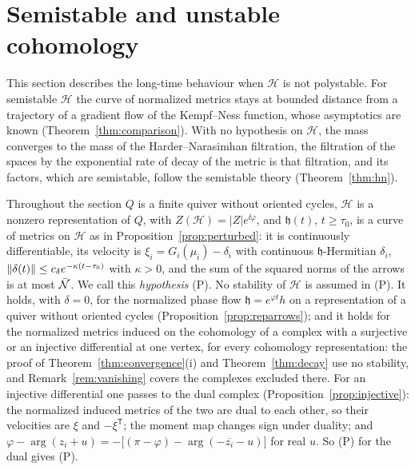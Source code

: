 \section{Semistable and unstable cohomology}\label{sec:asymptotics}

This section describes the long-time behaviour when $\mathcal H$ is not
polystable. For semistable $\mathcal H$ the curve of normalized metrics
stays at bounded distance from a trajectory of a gradient flow of the
Kempf--Ness function, whose asymptotics are known
(Theorem~\ref{thm:comparison}). With no hypothesis on $\mathcal H$, the mass
converges to the mass of the Harder--Narasimhan filtration, the filtration
of the spaces by the exponential rate of decay of the metric is that
filtration, and its factors, which are semistable, follow the semistable
theory (Theorem~\ref{thm:hn}).

Throughout the section $Q$ is a finite quiver without oriented cycles,
$\mathcal H$ is a nonzero representation of $Q$, with
$Z(\mathcal H)=|Z|e^{\ii\varphi}$, and $\mathfrak h(t)$,
$t\geq\tau_0$, is a curve of metrics on $\mathcal H$ as in
Proposition~\ref{prop:perturbed}: it is continuously differentiable, its
velocity is $\xi_i=G_i(\mu_i)-\delta_i$ with continuous
$\mathfrak h$-Hermitian $\delta_i$,
$\left\lVert\delta(t)\right\rVert\leq c_\delta e^{-\kappa(t-\tau_0)}$ with $\kappa>0$, and the
sum of the squared norms of the arrows is at most $\bar{\mathcal N}$. We call this
\emph{hypothesis} (P). No stability of $\mathcal H$ is assumed in (P). It
holds, with $\delta=0$, for the normalized phase flow
$\mathfrak h=e^{\varphi t}h$ on a representation of a quiver without oriented
cycles (Proposition~\ref{prop:reparrows}); and it holds for the normalized
metrics induced on the cohomology of a complex with a surjective or an
injective differential at one vertex, for every cohomology representation:
the proof of Theorem~\ref{thm:convergence}(i) and
Theorem~\ref{thm:decay} use no stability, and Remark~\ref{rem:vanishing}
covers the complexes excluded there. For an injective differential one
passes to the dual complex (Proposition~\ref{prop:injective}): the
normalized induced metrics of the two are dual to each other, so their
velocities are $\xi$ and $-\xi^{\mathsf T}$; the moment map changes sign
under duality; and
$\varphi-\arg(z_i+u)=-\bigl[(\pi-\varphi)-\arg(-\overline{z_i}-u)\bigr]$
for real $u$. So (P) for the dual gives (P).


